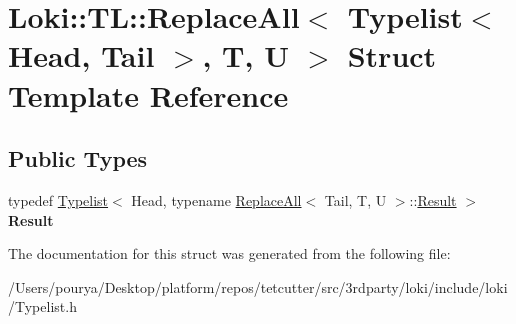 \hypertarget{structLoki_1_1TL_1_1ReplaceAll_3_01Typelist_3_01Head_00_01Tail_01_4_00_01T_00_01U_01_4}{}\section{Loki\+:\+:T\+L\+:\+:Replace\+All$<$ Typelist$<$ Head, Tail $>$, T, U $>$ Struct Template Reference}
\label{structLoki_1_1TL_1_1ReplaceAll_3_01Typelist_3_01Head_00_01Tail_01_4_00_01T_00_01U_01_4}
\subsection*{Public Types}
\begin{DoxyCompactItemize}
\item 
\hypertarget{structLoki_1_1TL_1_1ReplaceAll_3_01Typelist_3_01Head_00_01Tail_01_4_00_01T_00_01U_01_4_a12b5c565ee3ecc59c688ebf4906fc760}{}typedef \hyperlink{structLoki_1_1Typelist}{Typelist}$<$ Head, typename \hyperlink{structLoki_1_1TL_1_1ReplaceAll}{Replace\+All}$<$ Tail, T, U $>$\+::\hyperlink{structLoki_1_1Typelist}{Result} $>$ {\bfseries Result}\label{structLoki_1_1TL_1_1ReplaceAll_3_01Typelist_3_01Head_00_01Tail_01_4_00_01T_00_01U_01_4_a12b5c565ee3ecc59c688ebf4906fc760}

\end{DoxyCompactItemize}


The documentation for this struct was generated from the following file\+:\begin{DoxyCompactItemize}
\item 
/\+Users/pourya/\+Desktop/platform/repos/tetcutter/src/3rdparty/loki/include/loki/Typelist.\+h\end{DoxyCompactItemize}
